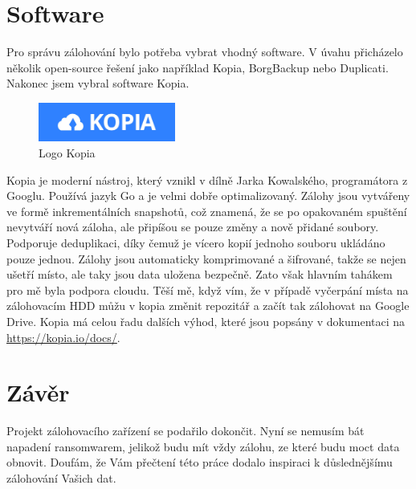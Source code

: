 \documentclass[a4paper,12pt, oneside]{book}
\begin{document}


\chapter{Software}

Pro správu zálohování bylo potřeba vybrat vhodný software. 
V úvahu přicházelo několik open-source řešení jako například 
Kopia, BorgBackup nebo Duplicati. Nakonec jsem vybral software 
Kopia. 

\begin{figure}
	\centering
	\includegraphics[width=0.4\textwidth]{img/kopia.jpg}
	\caption{Logo Kopia}
\end{figure}
Kopia je moderní nástroj, který vznikl v dílně Jarka Kowalského, 
programátora z Googlu. Používá jazyk Go a je velmi dobře optimalizovaný.
\cite{Kopia-GitHub}
Zálohy jsou vytvářeny ve formě inkrementálních snapshotů,
což znamená, že se po opakovaném spuštění nevytváří nová záloha, ale 
připíšou se pouze změny a nově přidané soubory. Podporuje deduplikaci,
díky čemuž je vícero kopií jednoho souboru ukládáno pouze jednou. 
Zálohy jsou automaticky komprimované a šifrované, takže se nejen ušetří 
místo, ale taky jsou data uložena bezpečně. \cite{Kopia-Docs} Zato však hlavním
tahákem pro mě byla podpora cloudu. Těší mě, když vím, že v případě vyčerpání
místa na 
zálohovacím HDD můžu v kopia změnit repozitář a začít tak zálohovat na 
Google Drive.
Kopia má celou řadu dalších výhod,
které jsou popsány v dokumentaci na \url{https://kopia.io/docs/}.

















\chapter{Závěr}

Projekt zálohovacího zařízení se podařilo dokončit. Nyní se nemusím bát napadení
ransomwarem, jelikož budu mít vždy zálohu, ze které budu moct data obnovit.
Doufám, že Vám přečtení této práce dodalo inspiraci k důslednějšímu zálohování 
Vašich dat.




\nocite{*}
\printbibliography[
	heading=bibintoc,
	title={Seznam zdrojů}
]

\cleardoublepage
\listoffigures
{}
\end{document}
